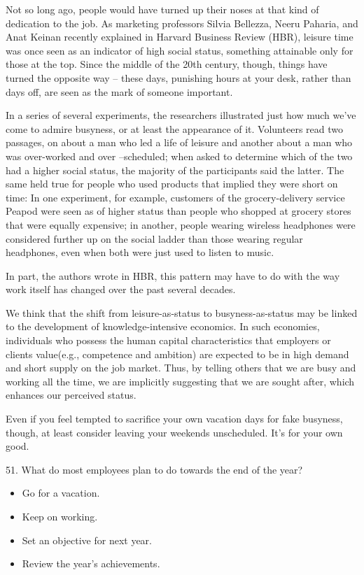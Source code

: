 \documentclass[UTF8,11pt]{ctexart}
\begin{document}
Not so long ago, people would have turned up their noses at that kind of dedication to the job. As marketing professors Silvia Bellezza, Neeru Paharia, and Anat Keinan recently explained in Harvard Business Review (HBR), leisure time was once seen as an indicator of high social status, something attainable only for those at the top. Since the middle of the 20th century, though, things have turned the opposite way – these days, punishing hours at your desk, rather than days off, are seen as the mark of someone important.


In a series of several experiments, the researchers illustrated just how much we’ve come to admire busyness, or at least the appearance of it. Volunteers read two passages, on about a man who led a life of leisure and another about a man who was over-worked and over –scheduled; when asked to determine which of the two had a higher social status, the majority of the participants said the latter. The same held true for people who used products that implied they were short on time: In one experiment, for example, customers of the grocery-delivery service Peapod were seen as of higher status than people who shopped at grocery stores that were equally expensive; in another, people wearing wireless headphones were considered further up on the social ladder than those wearing regular headphones, even when both were just used to listen to music.


In part, the authors wrote in HBR, this pattern may have to do with the way work itself has changed over the past several decades.


We think that the shift from leisure-as-status to busyness-as-status may be linked to the development of knowledge-intensive economics. In such economies, individuals who possess the human capital characteristics that employers or clients value(e.g., competence and ambition) are expected to be in high demand and short supply on the job market. Thus, by telling others that we are busy and working all the time, we are implicitly suggesting that we are sought after, which enhances our perceived status.


Even if you feel tempted to sacrifice your own vacation days for fake busyness, though, at least consider leaving your weekends unscheduled. It’s for your own good.


51. What do most employees plan to do towards the end of the year?


\begin{itemize}[leftmargin=2em,itemsep=.2em,topsep=.4em]\item[A.] Go for a vacation.
\item[B.] Keep on working.
\item[C.] Set an objective for next year.
\item[D.] Review the year’s achievements.
\end{itemize}
\end{document}
